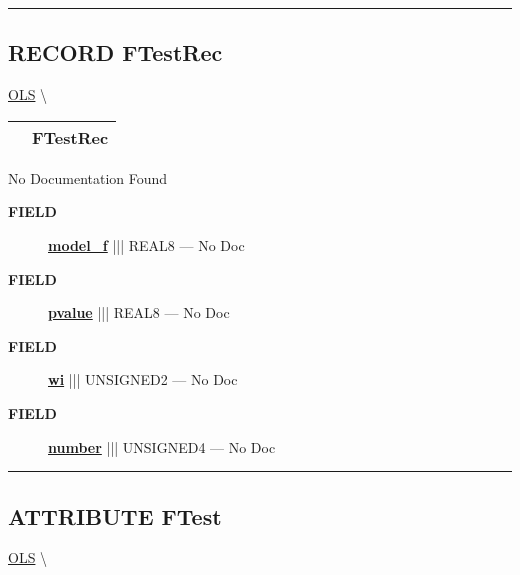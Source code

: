 \rule{\linewidth}{0.5pt}
\subsection*{\textsf{\colorbox{headtoc}{\color{white} RECORD}
FTestRec}}

\hypertarget{ecldoc:linearregression.ols.ftestrec}{}
\hspace{0pt} \hyperlink{ecldoc:linearregression.ols}{OLS} \textbackslash 

{\renewcommand{\arraystretch}{1.5}
\begin{tabularx}{\textwidth}{|>{\raggedright\arraybackslash}l|X|}
\hline
\hspace{0pt}\mytexttt{\color{red} } & \textbf{FTestRec} \\
\hline
\end{tabularx}
}

\par





No Documentation Found







\par
\begin{description}
\item [\colorbox{tagtype}{\color{white} \textbf{\textsf{FIELD}}}] \textbf{\underline{model\_f}} ||| REAL8 --- No Doc
\item [\colorbox{tagtype}{\color{white} \textbf{\textsf{FIELD}}}] \textbf{\underline{pvalue}} ||| REAL8 --- No Doc
\item [\colorbox{tagtype}{\color{white} \textbf{\textsf{FIELD}}}] \textbf{\underline{wi}} ||| UNSIGNED2 --- No Doc
\item [\colorbox{tagtype}{\color{white} \textbf{\textsf{FIELD}}}] \textbf{\underline{number}} ||| UNSIGNED4 --- No Doc
\end{description}





\rule{\linewidth}{0.5pt}
\subsection*{\textsf{\colorbox{headtoc}{\color{white} ATTRIBUTE}
FTest}}

\hypertarget{ecldoc:linearregression.ols.ftest}{}
\hspace{0pt} \hyperlink{ecldoc:linearregression.ols}{OLS} \textbackslash 

